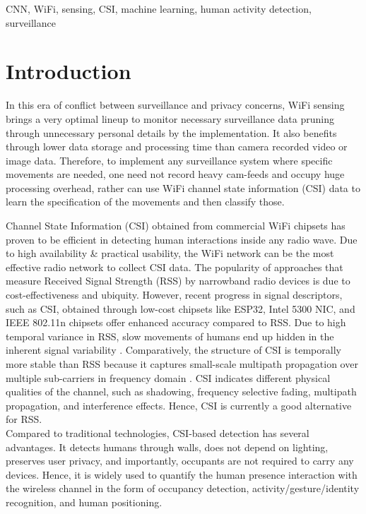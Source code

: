 \documentclass[conference]{IEEEtran}
\begin{document}
\begin{IEEEkeywords}
CNN, WiFi, sensing, CSI, machine learning, human activity detection, surveillance
\end{IEEEkeywords}

\section{Introduction}
In this era of conflict between surveillance and privacy concerns, WiFi sensing brings a very optimal lineup to monitor necessary surveillance data pruning through unnecessary personal details by the implementation. It also benefits through lower data storage and processing time than camera recorded video or image data. Therefore, to implement any surveillance system where specific movements are needed, one need not record heavy cam-feeds and occupy huge processing overhead, rather can use WiFi channel state information (CSI) data to learn the specification of the movements and then classify those.

Channel State Information (CSI) obtained from commercial WiFi chipsets has proven to be efficient in detecting human interactions inside any radio wave. Due to high availability \& practical usability, the WiFi network can be the most effective radio network to collect CSI data. The popularity of approaches that measure Received Signal Strength (RSS) by narrowband radio devices is due to cost-effectiveness and ubiquity. However, recent progress in signal descriptors, such as CSI, obtained through low-cost chipsets like ESP32, Intel 5300 NIC, and IEEE 802.11n chipsets offer enhanced accuracy compared to RSS. Due to high temporal variance in RSS, slow movements of humans end up hidden in the inherent signal variability \cite{a1}. Comparatively, the structure of CSI is temporally more stable than RSS because it captures small-scale multipath propagation over multiple sub-carriers in frequency domain \cite{a2} \cite{a3}. CSI indicates different physical qualities of the channel, such as shadowing, frequency selective fading, multipath propagation, and interference effects. Hence, CSI is currently a good alternative for RSS.\\
Compared to traditional technologies, CSI-based detection has several advantages. It detects humans through walls, does not depend on lighting, preserves user privacy, and importantly, occupants are not required to carry any devices. Hence, it is widely used to quantify the human presence interaction with the wireless channel in the form of occupancy detection, activity/gesture/identity recognition, and human positioning.\\
\end{document}
